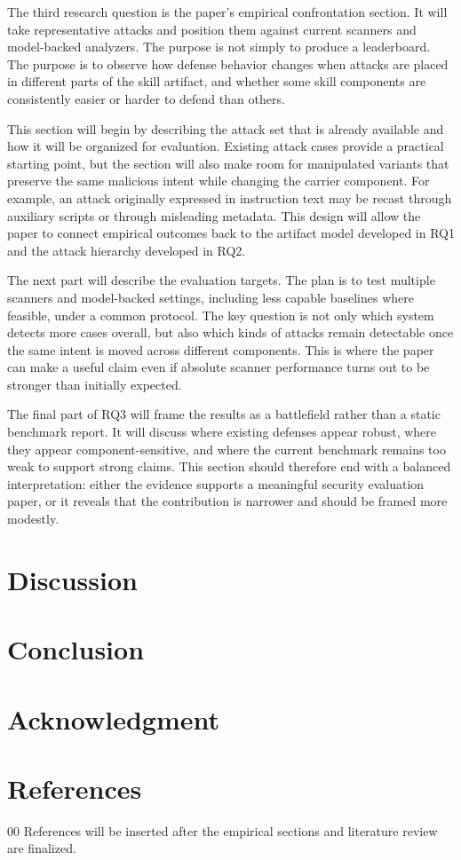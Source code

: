 \documentclass[conference]{IEEEtran}
\begin{document}
The third research question is the paper's empirical confrontation
section. It will take representative attacks and position them against
current scanners and model-backed analyzers. The purpose is not simply
to produce a leaderboard. The purpose is to observe how defense behavior
changes when attacks are placed in different parts of the skill
artifact, and whether some skill components are consistently easier or
harder to defend than others.

This section will begin by describing the attack set that is already
available and how it will be organized for evaluation. Existing attack
cases provide a practical starting point, but the section will also make
room for manipulated variants that preserve the same malicious intent
while changing the carrier component. For example, an attack originally
expressed in instruction text may be recast through auxiliary scripts or
through misleading metadata. This design will allow the paper to connect
empirical outcomes back to the artifact model developed in RQ1 and the
attack hierarchy developed in RQ2.

The next part will describe the evaluation targets. The plan is to test
multiple scanners and model-backed settings, including less capable
baselines where feasible, under a common protocol. The key question is
not only which system detects more cases overall, but also which kinds
of attacks remain detectable once the same intent is moved across
different components. This is where the paper can make a useful claim
even if absolute scanner performance turns out to be stronger than
initially expected.

The final part of RQ3 will frame the results as a battlefield rather
than a static benchmark report. It will discuss where existing defenses
appear robust, where they appear component-sensitive, and where the
current benchmark remains too weak to support strong claims. This
section should therefore end with a balanced interpretation: either the
evidence supports a meaningful security evaluation paper, or it reveals
that the contribution is narrower and should be framed more modestly.

\section{Discussion}

\section{Conclusion}

\section*{Acknowledgment}

\section*{References}

\begin{thebibliography}{00}
 References will be inserted after the empirical
sections and literature review are finalized.
\end{thebibliography}
\end{document}
